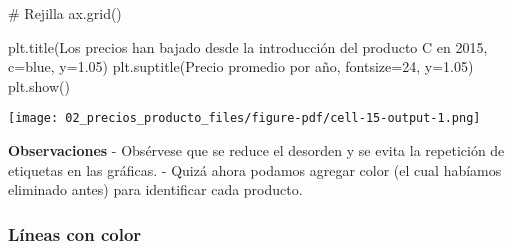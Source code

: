 \documentclass[
  letterpaper,
  DIV=11,
  numbers=noendperiod]{scrreprt}
\newenvironment{Shaded}{\begin{snugshade}}{\end{snugshade}}
\newcommand{\CommentTok}[1]{\textcolor[rgb]{0.37,0.37,0.37}{#1}}
\newcommand{\DecValTok}[1]{\textcolor[rgb]{0.68,0.00,0.00}{#1}}
\newcommand{\FloatTok}[1]{\textcolor[rgb]{0.68,0.00,0.00}{#1}}
\newcommand{\NormalTok}[1]{\textcolor[rgb]{0.00,0.23,0.31}{#1}}
\newcommand{\OperatorTok}[1]{\textcolor[rgb]{0.37,0.37,0.37}{#1}}
\newcommand{\StringTok}[1]{\textcolor[rgb]{0.13,0.47,0.30}{#1}}
\begin{document}
\begin{Shaded}
\begin{Highlighting}[]
\CommentTok{\# Rejilla }
\NormalTok{ax.grid()}

\NormalTok{plt.title(}\StringTok{\textquotesingle{}Los precios han bajado desde la introducción del producto C en 2015\textquotesingle{}}\NormalTok{, c}\OperatorTok{=}\StringTok{\textquotesingle{}blue\textquotesingle{}}\NormalTok{, y}\OperatorTok{=}\FloatTok{1.05}\NormalTok{)}
\NormalTok{plt.suptitle(}\StringTok{\textquotesingle{}Precio promedio por año\textquotesingle{}}\NormalTok{, fontsize}\OperatorTok{=}\DecValTok{24}\NormalTok{, y}\OperatorTok{=}\FloatTok{1.05}\NormalTok{)}
\NormalTok{plt.show()}
\end{Highlighting}
\end{Shaded}

\texttt{[image: 02\_precios\_producto\_files/figure-pdf/cell-15-output-1.png]}

\textbf{Observaciones} - Obsérvese que se reduce el desorden y se evita
la repetición de etiquetas en las gráficas. - Quizá ahora podamos
agregar color (el cual habíamos eliminado antes) para identificar cada
producto.

\subsubsection{Líneas con color}\label{luxedneas-con-color}
\end{document}
